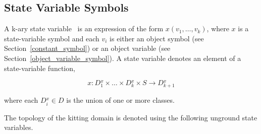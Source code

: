 \subsection{State Variable Symbols}\label{state_variable_symbol}
A k-ary state variable~\cite{NAU.2004} is an expression of the form $x(v_1,\dots,v_k)$, where $x$ is a
state-variable symbol and each $v_i$ is either an object symbol (see Section~\ref{constant_symbol}) or an object variable (see Section~\ref{object_variable_symbol}).
A state variable denotes an element of a state-variable function,

\begin{equation*}
    x: D{_1^x}\times \dots\times D{_k^x}\times S \rightarrow D{_{k+1}^x}
\end{equation*}

where each $D{_i^x}\in D$ is the union of one or more classes.

\begin{comment}
Consider the kitting domain described in Section~\ref{kitting_domain}. We can use \textit{gloc}({\constant{g1}}) to designate the current location of gripper g1 in the workstation. According to the state-transition system for the kitting domain, in the state $s_0$ we have \textit{gloc}({\constant{g1}})=chstation; in the state $s_1$  we have \textit{gloc}({\constant{g1}})={\constant{r1}}. From the definition of a k-ary state variable, \textit{gloc} can be expressed as \textit{gloc}: {\itshape {grippers}} $\times S \rightarrow$ {\itshape {changing stations}} $\cup$ {\itshape {robots}}.\\ \\
\end{comment}
The topology of the kitting domain is denoted using the following unground state variables.

